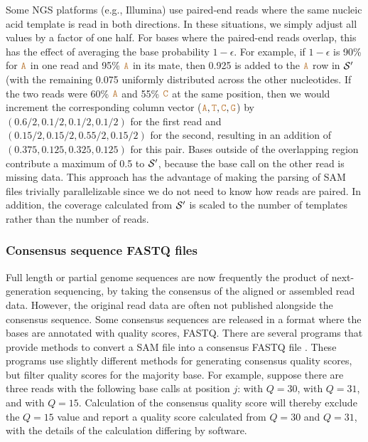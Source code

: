 \documentclass[10pt]{article}
\begin{document}
Some NGS platforms (e.g., Illumina) use paired-end reads where the same nucleic acid template is read in both directions.
In these situations, we simply adjust all values by a factor of one half.
For bases where the paired-end reads overlap, this has the effect of averaging the base probability $1-\epsilon$.
For example, if $1-\epsilon$ is 90\% for $\texttt{\textcolor{brown}{A}}$ in one read and 95\% $\texttt{\textcolor{brown}{A}}$ in its mate, then 0.925 is added to the $\texttt{\textcolor{brown}{A}}$ row in $\mathcal{S}'$ (with the remaining 0.075 uniformly distributed across the other nucleotides.
If the two reads were 60\% $\texttt{\textcolor{brown}{A}}$ and 55\% $\texttt{\textcolor{brown}{C}}$ at the same position, then we would increment the corresponding column vector ($\texttt{\textcolor{brown}{A}}, \texttt{\textcolor{brown}{T}}, \texttt{\textcolor{brown}{C}}, \texttt{\textcolor{brown}{G}}$) by $(0.6/2, 0.1/2, 0.1/2, 0.1/2)$ for the first read and $(0.15/2, 0.15/2, 0.55/2, 0.15/2)$ for the second, resulting in an addition of $(0.375, 0.125, 0.325, 0.125)$ for this pair.
Bases outside of the overlapping region contribute a maximum of 0.5 to $\mathcal{S}'$, because the base call on the other read is missing data.
This approach has the advantage of making the parsing of SAM files trivially parallelizable since we do not need to know how reads are paired.
In addition, the coverage calculated from $\mathcal{S}'$ is scaled to the number of templates rather than the number of reads.


\subsubsection{Consensus sequence FASTQ files}
\label{fastq_construction}

Full length or partial genome sequences are now frequently the product of next-generation sequencing, by taking the consensus of the aligned or assembled read data.
However, the original read data are often not published alongside the consensus sequence.
Some consensus sequences are released in a format where the bases are annotated with quality scores, \eg FASTQ.
There are several programs that provide methods to convert a SAM file into a consensus FASTQ file \citep{liAdjustQualityScores2004, keithSimulatedAnnealingAlgorithm2002, liMappingShortDNA2008a}.
These programs use slightly different methods for generating consensus quality scores, but filter quality scores for the majority base.
For example, suppose there are three reads with the following base calls at position $j$:  with $Q=30$,  with $Q=31$, and  with $Q=15$.
Calculation of the consensus quality score will thereby exclude the $Q=15$ value and report a quality score calculated from $Q=30$ and $Q=31$, with the details of the calculation differing by software.
\end{document}
